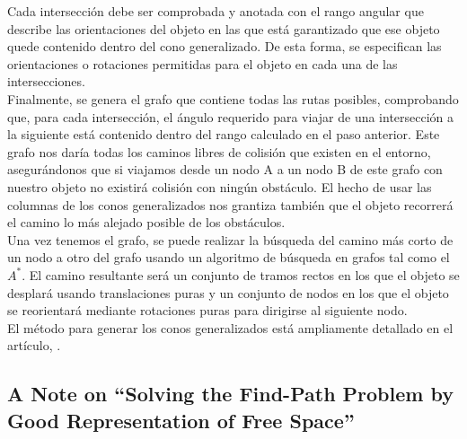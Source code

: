 Cada intersección debe ser comprobada y anotada con el rango angular que describe las orientaciones del objeto en las que está garantizado que ese objeto quede contenido dentro del cono generalizado. De esta forma, se especifican las orientaciones o rotaciones permitidas para el objeto en cada una de las intersecciones.\\

Finalmente, se genera el grafo que contiene todas las rutas posibles, comprobando que, para cada intersección, el ángulo requerido para viajar de una intersección a la siguiente está contenido dentro del rango calculado en el paso anterior. Este grafo nos daría todas los caminos libres de colisión que existen en el entorno, asegurándonos que si viajamos desde un nodo A a un nodo B de este grafo con nuestro objeto no existirá colisión con ningún obstáculo. El hecho de usar las columnas de los conos generalizados nos grantiza también que el objeto recorrerá el camino lo más alejado posible de los obstáculos.\\

Una vez tenemos el grafo, se puede realizar la búsqueda del camino más corto de un nodo a otro del grafo usando un algoritmo de búsqueda en grafos tal como el $A^*$. El camino resultante será un conjunto de tramos rectos en los que el objeto se desplará usando translaciones puras y un conjunto de nodos en los que el objeto se reorientará mediante rotaciones puras para dirigirse al siguiente nodo.\\

El método para generar los conos generalizados está ampliamente detallado en el artículo, .\\

\subsection{A Note on ``Solving the Find-Path Problem by Good Representation of Free Space''}

\newpage

